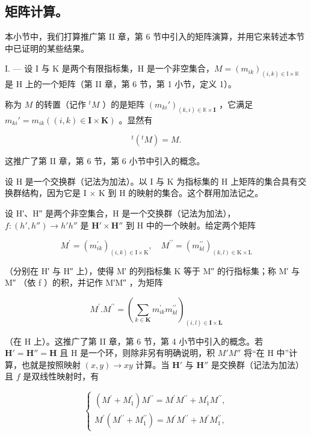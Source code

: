 \subsection{矩阵计算。}

本小节中，我们打算推广第 II 章，第 6 节中引入的矩阵演算，并用它来转述本节中已证明的某些结果。

I. --- 设 I 与 K 是两个有限指标集，H 是一个非空集合，\(M = (m_{ik})_{(i,k) \in \mathbb{I} \times \mathbb{K}}\) 是 H 上的一个矩阵（第 II 章，第 6 节，第 1 小节，定义 1）。

称为 \(M\) 的转置（记作 \({}^t M\) ）的是矩阵 \((m_{ki}')_{(k,i) \in \mathbb{K} \times \mathbf{I}}\) ，它满足 \(m_{ki}' = m_{ik} ((i, k) \in \mathbf{I} \times \mathbf{K})\) 。显然有

\[
^ {t} (^ {t} M) = M.\tag{39}
\]

这推广了第 II 章，第 6 节，第 6 小节中引入的概念。

设 H 是一个交换群（记法为加法）。以 I 与 K 为指标集的 H 上矩阵的集合具有交换群结构，因为它是 I × K 到 H 的映射的集合。这个群用加法记之。

设 H′、H″ 是两个非空集合，H 是一个交换群（记法为加法），\(f:(h',h'')\to h'h''\) 是 \(\mathbf{H}'\times\mathbf{H}''\) 到 H 中的一个映射。给定两个矩阵

\[
M ^ {\prime} = (m _ {i k} ^ {\prime}) _ {(i, k) \in \mathrm{I} \times \mathrm{K}}, \quad M ^ {\prime \prime} = (m _ {k l} ^ {\prime \prime}) _ {(k, l) \in \mathrm{K} \times \mathrm{L}}
\]

（分别在 H′ 与 H″ 上），使得 M′ 的列指标集 K 等于 M″ 的行指标集；称 M′ 与 M″ （依 f ）的积，并记作 M′M″ ，为矩阵

\[
M ^ {\prime}. M ^ {\prime \prime} = (\sum_ {k \in \mathbf {K}} m _ {i k} ^ {\prime} m _ {k l} ^ {\prime \prime}) _ {(i, l) \in \mathbf {I} \times \mathbf {L}}\tag{40}
\]

（在 H 上）。这推广了第 II 章，第 6 节，第 4 小节中引入的概念。若 \(\mathbf{H}' = \mathbf{H}'' = \mathbf{H}\) 且 H 是一个环，则除非另有明确说明，积 \(M'M''\) 将“在 H 中”计算，也就是按照映射 \((x, y) \to xy\) 计算。当 \(\mathbf{H}'\) 与 \(\mathbf{H}''\) 是交换群（记法为加法）且 \(f\) 是双线性映射时，有

\[
\left\{ \begin{array}{l} (M ^ {\prime} + M _ {1} ^ {\prime}) M ^ {\prime \prime} = M ^ {\prime} M ^ {\prime \prime} + M _ {1} ^ {\prime} M ^ {\prime \prime}, \\ M ^ {\prime} (M ^ {\prime \prime} + M _ {1} ^ {\prime \prime}) = M ^ {\prime} M ^ {\prime \prime} + M ^ {\prime} M _ {1} ^ {\prime \prime}, \end{array} \right.\tag{41}
\]


